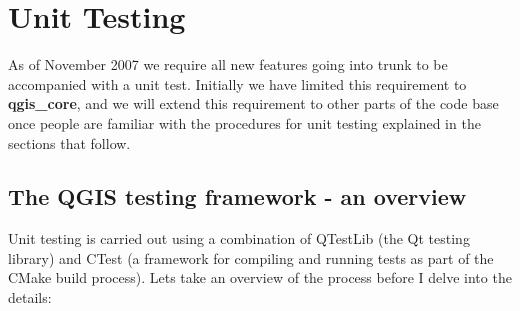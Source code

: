\hypertarget{toc47}{}
\section{Unit Testing}
As of November 2007 we require all new features going into trunk to be
accompanied with a unit test. Initially we have limited this requirement to
\textbf{qgis\_core}, and we will extend this requirement to other parts of the code base
once people are familiar with the procedures for unit testing explained in the
sections that follow.

\hypertarget{toc48}{}
\subsection{The QGIS testing framework  - an overview}
Unit testing is carried out using a combination of QTestLib (the Qt testing
library) and CTest (a framework for compiling and running tests as part of the
CMake build process).  Lets take an overview of the process before I delve into
the details:

